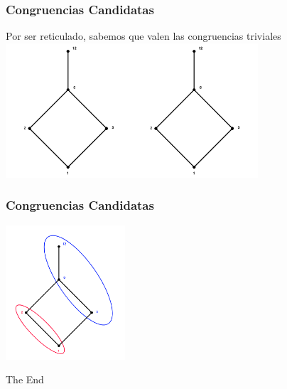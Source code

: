 \documentclass{beamer}
\begin{document}
\begin{frame}
\frametitle{Congruencias Candidatas}
Por ser reticulado, sabemos que valen las congruencias triviales
\includegraphics[height=5cm]{ret_diagram}\includegraphics[height=5cm]{ret_diagram}
\end{frame}

\begin{frame}
\frametitle{Congruencias Candidatas}

\includegraphics[height=5cm]{congruencia_1}
\end{frame}

\begin{frame}
\Huge{\centerline{The End}}
\end{frame}

\end{document}
